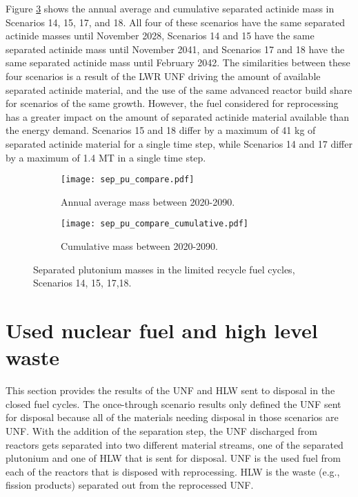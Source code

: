 Figure 
\ref{fig:recycle_sep_pu} shows the annual average and cumulative 
separated actinide mass in Scenarios 14, 15, 17, and 18. All four of 
these scenarios have the same separated actinide masses until 
November 2028, Scenarios 14 and 15 have the same separated actinide 
mass until November 2041, and Scenarios 17 and 18 have the same separated 
actinide mass until February 2042. The similarities between these four 
scenarios is a result of the \gls{LWR} \gls{UNF} driving the amount 
of available separated actinide material, and the use of the 
same advanced reactor build share for scenarios of the same growth. 
However, the fuel considered for reprocessing has a greater impact 
on the amount of separated actinide material available than the 
energy demand. Scenarios 15 and 18 differ by a maximum of 41 kg of 
separated actinide material for a single time step, while Scenarios 
14 and 17 differ by a maximum of 1.4 MT in a single time step. 

\begin{figure}[h!]
    \centering
    \begin{subfigure}[b]{0.49\textwidth}
        \centering
        \texttt{[image: sep\_pu\_compare.pdf]}
        \caption{Annual average mass between 2020-2090.}
        \label{fig:_recycle_sep_pu_all}
    \end{subfigure}
    \hfill
    \begin{subfigure}[b]{0.49\textwidth}
        \centering
        \texttt{[image: sep\_pu\_compare\_cumulative.pdf]}
        \caption{Cumulative mass between 2020-2090.}
        \label{fig:recycle_sep_pu_cumulative}
    \end{subfigure}
       \caption{Separated plutonium masses in the limited 
       recycle fuel cycles, Scenarios 14, 15, 17,18.}
       \label{fig:recycle_sep_pu}
\end{figure}

\section{Used nuclear fuel and high level waste}
This section provides the results of the \gls{UNF} and \gls{HLW} sent 
to disposal in the closed fuel cycles. The once-through scenario 
results only defined the \gls{UNF} sent for disposal because all 
of the materials needing disposal in those scenarios are \gls{UNF}. 
With the addition of the separation step, the \gls{UNF} discharged 
from reactors gets separated into two different material streams, 
one of the separated plutonium and one of \gls{HLW} that is sent 
for disposal. \gls{UNF} 
is the used fuel from each of the reactors that is disposed 
with reprocessing. \gls{HLW} is 
the waste (e.g., fission products) separated out from the 
reprocessed \gls{UNF}. 

